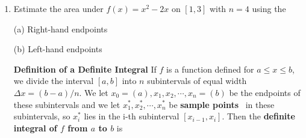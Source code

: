 \documentclass[11pt,fleqn]{article}
\begin{document}
\begin{enumerate}


\item  Estimate the area under $f(x) = x^2 - 2x$ on $[1,
3]$ with $n = 4$ using the 

  \begin{adjustbox}{valign=t,minipage={.65\textwidth}}
     (a) Right-hand endpoints 
     \vspace{1in}
     
     (b)  Left-hand endpoints %
      \vspace{1in}
  \end{adjustbox}
  \begin{adjustbox}{valign=t,minipage={.25\textwidth}}
\end{adjustbox}


\begin{framed}
   \textbf{Definition of a Definite Integral} If $f$ is a function
   defined for $a \le x \le b$, we divide the interval $[a, b]$ into
   $n$ subintervals of equal width $\Delta x = (b-a)/n$. We let
   $x_0 = (a), x_1, x_2, \cdots, x_n =(b)$ be the endpoints of these
   subintervals and we let $x_1^*, x_2^*, \cdots, x_n^*$ be 
   \textbf{sample points}\footnotemark \ %
    in these subintervals, so $x_i^*$ lies in
   the i-th subinterval $[x_{i-1}, x_i]$. Then the \textbf{definite
     integral of $f$ from $a$ to $b$} is


\end{framed}
\end{enumerate}
\end{document}
